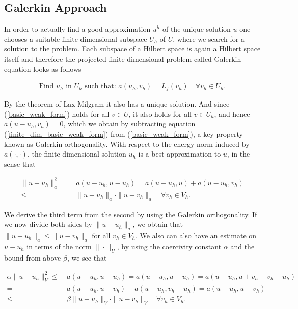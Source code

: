 \documentclass[../draft_1.tex]{subfiles}
\begin{document}
\subsection{Galerkin Approach}
In order to actually find a good approximation $u^h$ of the unique solution $u$ one chooses a suitable finite dimensional subspace $U_h$ of $U$, where we search for a solution to the problem. Each subspace of a Hilbert space is again a Hilbert space itself and therefore the projected finite dimensional problem called Galerkin equation looks as follows
\begin{ceqn}
\begin{equation}
\begin{aligned}
\label{finite_dim_basic_weak_form}
\text{Find } u_h \text{ in } U_h \text{ such that:  } a(u_h, v_h) = L_f(v_h) \quad \forall v_h \in U_h.
\end{aligned}
\end{equation}
\end{ceqn}
By the theorem of Lax-Milgram it also has a unique solution. And since (\ref{basic_weak_form}) holds for all $v \in U$, it also holds for all $v \in U_h$, and hence $a(u-u_h, v_h) = 0$, which we obtain by subtracting equation (\ref{finite_dim_basic_weak_form}) from (\ref{basic_weak_form}), a key property known as Galerkin orthogonality. With respect to the energy norm induced by $a(\cdot, \cdot)$, the finite dimensional solution $u_h$ is a best approximation to $u$, in the sense that 
\begin{ceqn}
\begin{equation}
\begin{aligned}
\| u - u_h \|_a^2 =& \ a(u-u_h, u-u_h) = a(u-u_h, u) + a(u-u_h, v_h) \\
\leq& \ \|u - u_h \|_a \cdot \| u - v_h \|_a \quad \forall v_h \in V_h.
\end{aligned}
\end{equation}
\end{ceqn}
We derive the third term from the second by using the Galerkin orthogonality. If we now divide both sides by $\| u - u_h\|_a$, we obtain that $\| u - u_h \|_a \leq \| u -v_h\|_a$ for all $v_h \in V_h$. We also can also have an estimate on $u - u_h$ in terms of the norm $\| \cdot \|_U$, by using the coercivity constant $\alpha$ and the bound from above $\beta$, we see that
\begin{ceqn}
\begin{equation}
\begin{aligned}
\label{approx_property}
\alpha \| u - u_h \|_V^2 \leq& \ a(u-u_h, u-u_h) = a(u-u_h, u- u_h) = a(u-u_h, u +v_h - v_h - u_h ) \\
=& \ a(u-u_h, u - v_h) + a(u - u_h, v_h - u_h) = a(u-u_h, u - v_h) \\
\leq& \ \beta \| u - u_h \|_V \cdot \| u - v_h\|_V  \quad \forall v_h \in V_h.
\end{aligned}
\end{equation}
\end{ceqn}
\end{document}
